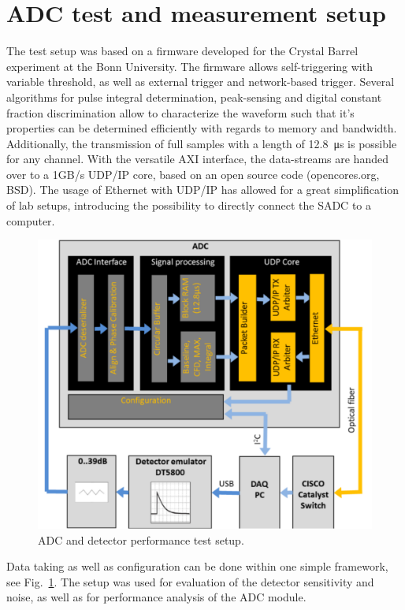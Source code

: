 \documentclass[12pt,a4paper, twocolumn]{article}
\newcommand{\Reffig}[1]{Fig.~\ref{#1}}
\begin{document}
\section{ADC test and measurement setup}
The test setup was based on a firmware developed for the Crystal Barrel experiment at the Bonn University. The firmware allows self-triggering with variable threshold, as well as external trigger and network-based trigger. Several algorithms for pulse integral determination, peak-sensing and digital constant fraction discrimination allow to characterize the waveform such that it's properties can be determined efficiently with regards to memory and bandwidth. Additionally, the transmission of full samples with a length of \SI{12.8}{\micro\second} is possible for any channel. With the versatile AXI interface, the data-streams are handed over to a 1GB/s UDP/IP core, based on an open source code (opencores.org, BSD). The usage of Ethernet with UDP/IP has allowed for a great simplification of lab setups, introducing the possibility to directly connect the SADC to a computer. 
\begin{figure}[htb]
\includegraphics[width=\linewidth]{fig/ADCsetup.pdf}
\caption{ADC and detector performance test setup.}
\label{fig:sadc:setup}
\end{figure}
Data taking as well as configuration can be done within one simple framework, see \Reffig{fig:sadc:setup}. The setup was used for evaluation of the detector sensitivity and noise, as well as for performance analysis of the ADC module.
\end{document}
